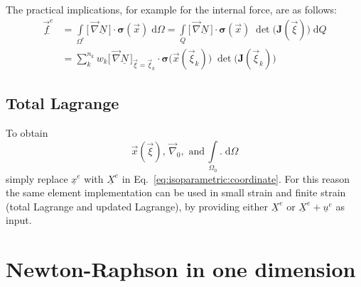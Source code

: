 \documentclass[times,namecite]{goose-article}
\begin{document}
The practical implications, for example for the internal force, are as follows:
\begin{align}
  \underline{\vec{f}^e}
  &=
  \int\limits_{\Omega^e}
    \big[\, \vec{\nabla} \underline{N} \,\big]
    \cdot
    \bm{\sigma}(\vec{x}) \;
  \mathrm{d}\Omega
  =
  \int\limits_{Q}
    \big[\, \vec{\nabla} \underline{N} \,\big]
    \cdot
    \bm{\sigma}(\vec{x}) \;
    \det \big( \bm{J}(\vec{\xi}) \big) \;
  \mathrm{d}Q
  \\
  &=
  \sum_{k}^{n_k}
  w_k
  \big[\, \vec{\nabla} \underline{N} \,\big]_{\vec{\xi} = \vec{\xi}_k}
  \cdot
  \bm{\sigma}\big(\vec{x}(\vec{\xi}_k)\big) \;
  \det \big( \bm{J}(\vec{\xi}_k) \big) \;
\end{align}

\subsection*{Total Lagrange}

To obtain
\begin{equation}
 \vec{x}(\vec{\xi}),\, \vec{\nabla}_0,\,\, \text{and}\, \int\limits_{\Omega_0} . \;\mathrm{d}\Omega
\end{equation}
simply replace $\underline{x}^e$ with $\underline{X}^e$ in Eq.~\eqref{eq:isoparametric:coordinate}. For this reason the same element implementation can be used in small strain and finite strain (total Lagrange and updated Lagrange), by providing either $\underline{X}^e$ or $\underline{X}^e + \underline{u}^e$ as input.


\section{Newton-Raphson in one dimension}
\label{sec:newton-raphson}
\end{document}
